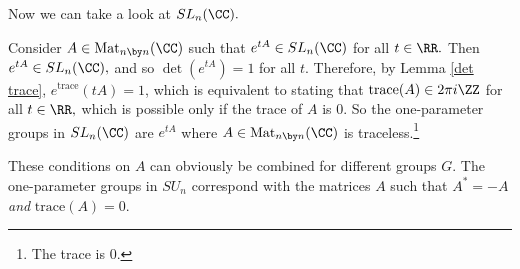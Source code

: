 Now we can take a look at $SL_n(\CC).$

\begin{example}
Consider $A \in \text{Mat}_{n \by n}(\CC)$  such that $e^{tA}  \in SL_n(\CC)$ for all $t \in\RR.$ Then $e^{tA} \in SL_n(\CC),$ and so $\det(e^{tA}) = 1$ for all $t.$ Therefore, by Lemma \ref{det trace}, $e^\text{trace}(tA) = 1$, which is equivalent to stating that $\text{trace}(A) \in 2\pi i \ZZ$ for all $ t \in \RR,$ which is possible only if the trace of $A$ is 0. So the one-parameter groups in $SL_n(\CC)$ are $e^{tA}$ where $A \in \text{Mat}_{n \by n}(\CC)$ is traceless.\footnote{The trace is 0.}
\end{example}

These conditions on $A$ can obviously be combined for different groups $G$. The one-parameter groups in $SU_n$ correspond with the matrices $A$ such that $A^* = -A$ \emph{and} $\text{trace}(A) = 0.$

